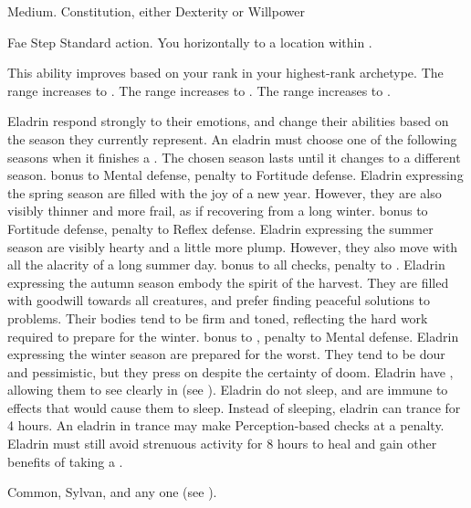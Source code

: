 Medium.
  Constitution, either  Dexterity or  Willpower
\begin{raggeditemize}
	\begin{magicalactiveability}{Fae Step}
		\abilityusagetime Standard action.
		\rankline
		You  horizontally to a location within \shortrange.

		\rankline
		This ability improves based on your rank in your highest-rank archetype.
		 The range increases to \medrange.
		 The range increases to \longrange.
		 The range increases to \distrange.
	\end{magicalactiveability}
	 Eladrin respond strongly to their emotions, and change their abilities based on the season they currently represent.
	An eladrin must choose one of the following seasons when it finishes a .
	The chosen season lasts until it changes to a different season.
	  bonus to Mental defense,  penalty to Fortitude defense.
	Eladrin expressing the spring season are filled with the joy of a new year.
	However, they are also visibly thinner and more frail, as if recovering from a long winter.
	  bonus to Fortitude defense,  penalty to Reflex defense.
	Eladrin expressing the summer season are visibly hearty and a little more plump.
	However, they also move with all the alacrity of a long summer day.
	  bonus to all checks,  penalty to .
	Eladrin expressing the autumn season embody the spirit of the harvest.
	They are filled with goodwill towards all creatures, and prefer finding peaceful solutions to problems.
	Their bodies tend to be firm and toned, reflecting the hard work required to prepare for the winter.
	  bonus to ,  penalty to Mental defense.
	Eladrin expressing the winter season are prepared for the worst.
	They tend to be dour and pessimistic, but they press on despite the certainty of doom.
	 Eladrin have , allowing them to see clearly in  (see ).
	 Eladrin do not sleep, and are immune to \magical effects that would cause them to sleep.
	Instead of sleeping, eladrin can trance for 4 hours.
	An eladrin in trance may make Perception-based checks at a  penalty.
	Eladrin must still avoid strenuous activity for 8 hours to heal and gain other benefits of taking a .
\end{raggeditemize}
 Common, Sylvan, and any one  (see ).


